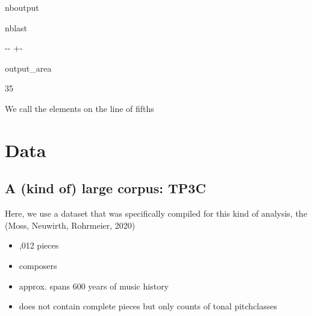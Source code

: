 \documentclass[letterpaper,10pt,english]{sphinxmanual}
\newlength\nbsphinxcodecellspacing
\begin{document}
\begin{sphinxuseclass}{nboutput}
\begin{sphinxuseclass}{nblast}
{

\kern-\sphinxverbatimsmallskipamount\kern-\baselineskip
\kern+\FrameHeightAdjust\kern-\fboxrule
\vspace{\nbsphinxcodecellspacing}

\begin{sphinxuseclass}{output_area}
\begin{sphinxuseclass}{}


\begin{sphinxVerbatim}[commandchars=\\\{\}]
\llap{\color{nbsphinxout}[5]:\,\hspace{\fboxrule}\hspace{\fboxsep}}35
\end{sphinxVerbatim}



\end{sphinxuseclass}
\end{sphinxuseclass}
}

\end{sphinxuseclass}
\end{sphinxuseclass}
\sphinxAtStartPar
We call the elements on the line of fifths 


\section{Data}
\label{\detokenize{05_data-driven_music_history:Data}}

\subsection{A (kind of) large corpus: TP3C}
\label{\detokenize{05_data-driven_music_history:A-(kind-of)-large-corpus:-TP3C}}
\sphinxAtStartPar
Here, we use a dataset that was specifically compiled for this kind of analysis, the  (Moss, Neuwirth, Rohrmeier, 2020)
\begin{itemize}
\item {} 
,012 pieces

\item {} 
 composers

\item {} 
\sphinxAtStartPar
approx. spans 600 years of music history

\item {} 
\sphinxAtStartPar
does not contain complete pieces but only counts of tonal pitch\sphinxhyphen{}classes

\end{itemize}
\end{document}
